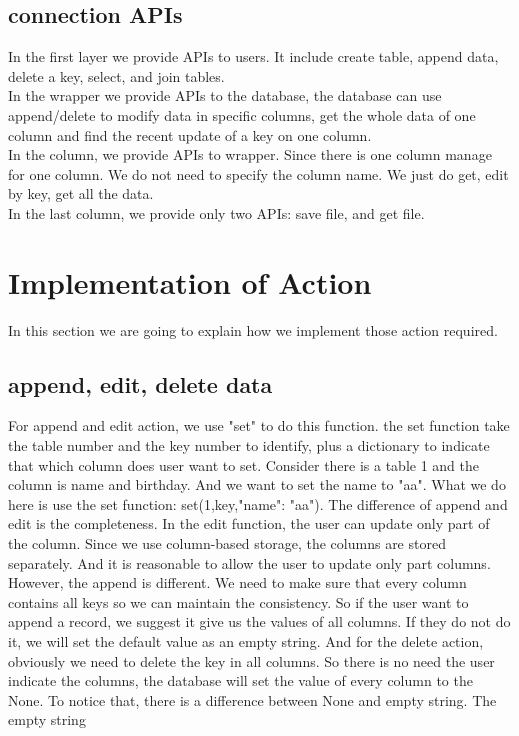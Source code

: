 \documentclass[a4paper]{article}
\begin{document}
\subsection{connection APIs}
In the first layer we provide APIs to users. It include create table, append data, delete a key, select, and join tables.\\
In the wrapper we provide APIs to the database, the database can use append/delete to modify data in specific columns, get the whole data of one column and find the recent update of a key on one column.\\
In the column, we provide APIs to wrapper. Since there is one column manage for one column. We do not need to specify the column name. We just do get, edit by key, get all the data.\\
In the last column, we provide only two APIs: save file, and get file.\\


\section{Implementation of Action}
In this section we are going to explain how we implement those action required.
\subsection{append, edit, delete data}
For append and edit action, we use "set" to do this function. the set function take the table number and the key number to identify, plus a dictionary to indicate that which column does user want to set. Consider there is a table 1 and the column is name and birthday. And we want to set the name to "aa". What we do here is use the set function: set(1,key,{"name": "aa"}). The difference of append and edit is the completeness. In the edit function, the user can update only part of the column. Since we use column-based storage, the columns are stored separately. And it is reasonable to allow the user to update only part columns. However, the append is different. We need to make sure that every column contains all keys so we can maintain the consistency. So if the user want to append a record, we suggest it give us the values of all columns. If they do not do it, we will set the default value as an empty string. And for the delete action, obviously we need to delete the key in all columns. So there is no need the user indicate the columns, the database will set the value of every column to the None. To notice that, there is a difference between None and empty string. The empty string
\end{document}
